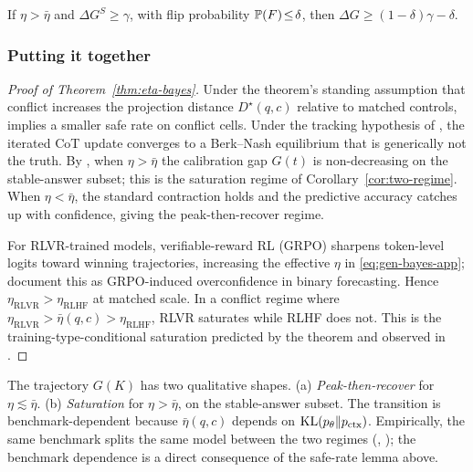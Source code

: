 \begin{corollary}
\label{cor:t3-decomposition}
If $\eta\!>\!\bar\eta$ and $\Delta G^S\!\ge\!\gamma$, with flip
probability $\mathbb{P}(F)\!\le\!\delta$, then
$\Delta G\!\ge\!(1\!-\!\delta)\gamma\!-\!\delta$.
\end{corollary}

\subsubsection{Putting it together}
\label{app:thm3-together}

\begin{proof}[Proof of Theorem~\ref{thm:eta-bayes}]
Under the theorem's standing assumption that conflict increases the
projection distance $D^\star(q,c)$ relative to matched controls,
 implies a smaller safe rate on conflict
cells.  Under the tracking hypothesis of , the
iterated CoT update converges to a Berk--Nash equilibrium that is
generically not the truth.  By
, when $\eta>\bar\eta$ the calibration gap $G(t)$ is
non-decreasing on the stable-answer subset; this is the
saturation regime of Corollary~\ref{cor:two-regime}.  When $\eta<\bar\eta$,
the standard \citet{kleijn2006} contraction holds and the predictive accuracy
catches up with confidence, giving the peak-then-recover regime.

For RLVR-trained models, verifiable-reward RL (GRPO) sharpens token-level
logits toward winning trajectories, increasing the effective $\eta$ in
\eqref{eq:gen-bayes-app}; \citet{bereket2025grpo} document this as
GRPO-induced overconfidence in binary forecasting.  Hence
$\eta_{\mathrm{RLVR}}>\eta_{\mathrm{RLHF}}$ at matched scale.  In a conflict
regime where $\eta_{\mathrm{RLVR}}>\bar\eta(q,c)>\eta_{\mathrm{RLHF}}$, RLVR
saturates while RLHF does not.  This is the training-type-conditional
saturation predicted by the theorem and observed in .
\end{proof}

\begin{corollary}
\label{cor:two-regime}
The trajectory $G(K)$ has two qualitative shapes. \textup{(a)}
\emph{Peak-then-recover} for $\eta\!\lesssim\!\bar\eta$. \textup{(b)}
\emph{Saturation} for $\eta\!>\!\bar\eta$, on the stable-answer
subset.  The transition is benchmark-dependent because $\bar\eta(q,c)$
depends on $\operatorname{KL}(p_\theta\|p_{\mathrm{ctx}})$.  Empirically, the same
benchmark splits the same model between the two regimes
(, ); the
benchmark dependence is a direct consequence of the safe-rate lemma
above.
\end{corollary}

